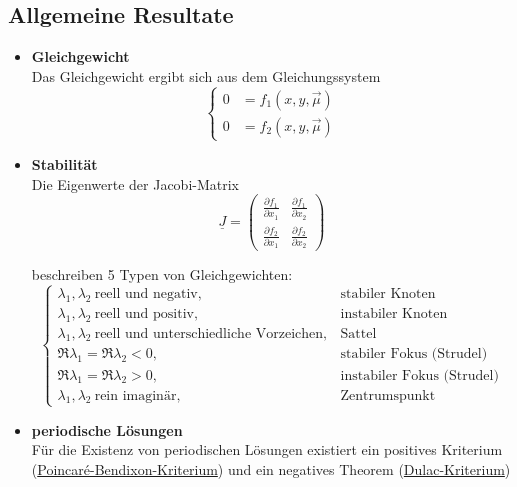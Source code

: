 \documentclass{article}
\begin{document}
\subsection{Allgemeine Resultate}
	\begin{itemize}
		\item \textbf{Gleichgewicht}\\
		Das Gleichgewicht ergibt sich aus dem Gleichungssystem
			\begin{equation}
				\begin{cases}
					0 &= f_1(x,y,\vec{\mu}) \\
					0 &= f_2(x,y,\vec{\mu})
				\end{cases}
			\end{equation}
		
		
		\item \textbf{Stabilität}\\
		Die Eigenwerte der Jacobi-Matrix
			\begin{equation}
				\underline{J} 
				=
				\begin{pmatrix}
					\frac{\partial f_1}{\partial x_1} & \frac{\partial f_1}{\partial x_2} \\
					\frac{\partial f_2}{\partial x_1} & \frac{\partial f_2}{\partial x_2}
				\end{pmatrix}
			\end{equation}
		
		beschreiben 5 Typen von Gleichgewichten:
			\begin{equation}
				\begin{cases}
					\lambda_1, \lambda_2\ \text{reell und negativ}, & \text{stabiler Knoten} \\
					\lambda_1, \lambda_2\ \text{reell und positiv}, & \text{instabiler Knoten} \\
					\lambda_1, \lambda_2\ \text{reell und unterschiedliche Vorzeichen}, & \text{Sattel} \\
					\Re\lambda_1 = \Re\lambda_2 < 0, & \text{stabiler Fokus (Strudel)} \\
					\Re\lambda_1 = \Re\lambda_2 > 0, & \text{instabiler Fokus (Strudel)} \\
					\lambda_1, \lambda_2\ \text{rein imaginär}, & \text{Zentrumspunkt}
				\end{cases}
			\end{equation}
		
		
		\item \textbf{periodische Lösungen}\\
		Für die Existenz von periodischen Lösungen existiert ein positives Kriterium\\ (\underline{Poincaré-Bendixon-Kriterium}) und ein negatives Theorem (\underline{Dulac-Kriterium})		
	\end{itemize}
\end{document}
